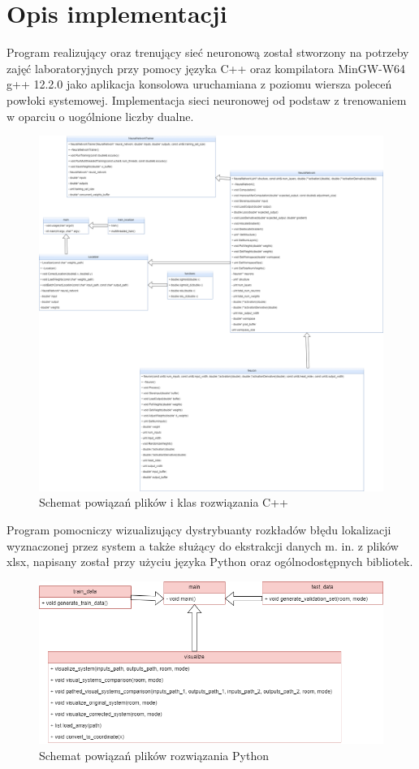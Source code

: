 \documentclass{classrep}
\begin{document}
\section{Opis implementacji}
{
Program realizujący oraz trenujący sieć neuronową został stworzony na potrzeby zajęć laboratoryjnych przy pomocy języka C++ oraz kompilatora MinGW-W64 g++ 12.2.0 jako aplikacja konsolowa uruchamiana z poziomu wiersza poleceń powłoki systemowej. Implementacja sieci neuronowej od podstaw z trenowaniem w oparciu o uogólnione liczby dualne. 
    \begin{figure}[!htbp]
            \centering
            \includegraphics[width=\textwidth, width=150mm]{loca.png}
            \caption{Schemat powiązań plików i klas rozwiązania C++}
            \label{loca}
    \end{figure}

Program pomocniczy wizualizujący dystrybuanty rozkładów błędu lokalizacji wyznaczonej przez system a także służący do ekstrakcji danych m. in. z plików xlsx, napisany został przy użyciu języka Python oraz ogólnodostępnych bibliotek.

    \begin{figure}[!htbp]
            \centering
            \includegraphics[width=\textwidth, width=150mm]{locapyth.png}
            \caption{Schemat powiązań plików rozwiązania Python}
            \label{locpyth}
    \end{figure} 
}
\end{document}
